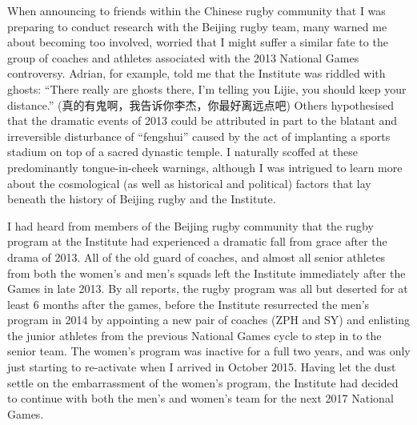 When announcing to friends within the Chinese rugby community that I was preparing to conduct research with the Beijing rugby team, many warned me about becoming too involved, worried that I might suffer a similar fate to the group of coaches and athletes associated with the 2013 National Games controversy.  Adrian, for example, told me that the Institute was riddled with ghosts: ``There really are ghosts there, I'm telling you Lijie, you should keep your distance.'' (真的有鬼啊，我告诉你李杰，你最好离远点吧)  Others hypothesised that the dramatic events of 2013 could be attributed in part to the blatant and irreversible disturbance of ``fengshui'' caused by the act of implanting a sports stadium on top of a sacred dynastic temple.  I naturally scoffed at these predominantly tongue-in-cheek warnings, although I was intrigued to learn more about the cosmological (as well as historical and political) factors that lay beneath the history of Beijing rugby and the Institute.

I had heard from members of the Beijing rugby community that the rugby program at the Institute had experienced a dramatic fall from grace after the drama of 2013.  All of the old guard of coaches, and almost all senior athletes from both the women's and men's squads left the Institute immediately after the Games in late 2013.  By all reports, the rugby program was all but deserted for at least 6 months after the games, before the Institute resurrected the men's program in 2014 by appointing a new pair of coaches (ZPH and SY) and enlisting the junior athletes from the previous National Games cycle to step in to the senior team.  The women's program was inactive for a full two years, and was only just starting to re-activate when I arrived in October 2015.  Having let the dust settle on the embarrassment of the women's program, the Institute had decided to continue with both the men's and women's team for the next 2017 National Games.


